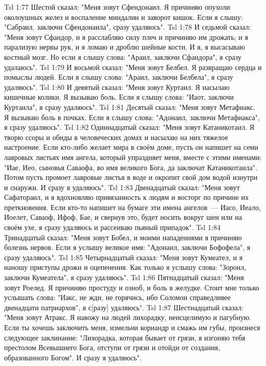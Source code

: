 \vs Tsl 1:77 
Шестой сказал: "Меня зовут Сфендонаил. Я причиняю опухоли околоушных желез и воспаление миндалин и заворот кишок. Если я слышу: "Сабраил, заключи Сфендонаила", сразу удаляюсь".
\vs Tsl 1:78 
И седьмой сказал: "Меня зовут Сфандор, и я расслабляю силу плеч и причиняю им дрожать; и я парализую нервы рук, и я ломаю и дроблю шейные кости. И я, я высасываю костный мозг. Но если я слышу слова: "Араил, заключи Сфандора", я сразу удалаюсь".
\vs Tsl 1:79 
И восьмой сказал: "Меня зовут Белбел. Я развращаю сердца и помыслы людей. Если я слышу слова: "Араил, заключи Белбела", я сразу удаляюсь".
\vs Tsl 1:80 
И девятый сказал: "Меня зовут Куртаил. Я насылаю кишечные колики. Я вызываю боль. Если я слышу слова: "Иаот, заключи Куртаила", я сразу удаляюсь".
\vs Tsl 1:81 
Десятый сказал: "Меня зовут Метафиакс. Я вызываю боль в почках. Если я слышу слова: "Адонаил, заключи Метафиакса", я сразу удаляюсь".
\vs Tsl 1:82 
Одиннадцатый сказал: "Меня зовут Катаникотаил. Я творю ссоры и обиды в человеческих домах и насылаю на них тяжелое настроение. Если кто-либо желает мира в своём доме, пусть он напишет на семи лавровых листьях имя ангела, который упраздняет меня, вместе с этими именами: "Иае, Иео, сыновья Саваофа, во имя великого Бога, да заключат Катаникотаила". Потом пусть промоет лавровые листья в воде и окропит свой дом водой изнутри и снаружи. И сразу я удаляюсь".
\vs Tsl 1:83 
Двенадцатый сказал: "Меня зовут Сафатораил, и я вдохновляю привязанность к людям и восторг по причине их преткновения. Если кто-то напишет на бумаге эти имена ангелов~--- Иасо, Иеало, Иоелет, Саваоф, Ифоф, Бае, и свернув это, будет носить вокруг шеи или на своём ухе, я сразу удаляюсь и рассеиваю пьяный припадок".
\vs Tsl 1:84 
Тринадцатый сказал: "Меня зовут Бобел, и моими нападениями я причиняю болезнь нервов. Если я услышу великое имя: "Адонаил, заключи Бофофела", я сразу удаляюсь".
\vs Tsl 1:85 
Четырнадцатый сказал: "Меня зовут Кумеател, и я наношу приступы дрожи и оцепенения. Как только я услышу слова: "Зороил, заключи Кумеатела", я сразу удаляюсь".
\vs Tsl 1:86 
Пятнадцатый сказал: "Меня зовут Роелед. Я причиняю простуду и озноб, и боль в желудке. Стоит мне только услышать слова: "Иакс, не жди, не горячись, ибо Соломон справедливее двенадцати патриархов", я с[разу] удаляюсь".
\vs Tsl 1:87 
Шестнадцатый сказал: "Меня зовут Атракс. Я навожу на людей лихорадку, неисцелимую и пагубную. Если ты хочешь заключить меня, измельчи кориандр и смажь им губы, произнеся следующее заклинание: "Лихорадка, которая бывает от грязи, я изгоняю тебя престолом Всевышнего Бога, отступи от грязи и отойди от создания, образованного Богом". И сразу я удаляюсь".
